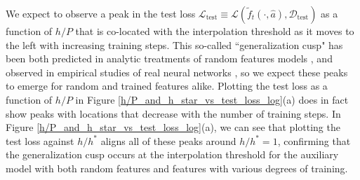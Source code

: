 \documentclass[11pt]{article}
\begin{document}
We expect to observe a peak in the test loss $\mathcal L_\text{test} \equiv \mathcal L (\tilde f_t(\cdot, \hat 
a), \mathcal D_\text{test})$ as a function of $h/P$ that is co-located with the interpolation threshold as it moves to the left with increasing training steps. This so-called ``generalization cusp" has been both predicted in analytic treatments of random features models \cite{meiGeneralizationErrorRandom2019}, \cite{dengModelDoubleDescent2020} and observed in empirical studies of real neural networks \cite{geigerJammingTransitionParadigm2019,spiglerJammingTransitionOverparametrization2019}, so we expect these peaks to emerge for random and trained features alike. Plotting the test loss as a function of $h/P$ in Figure \ref{h/P_and_h_star_vs_test_loss_log}(a) does in fact show peaks with locations that decrease with the number of training steps. In Figure \ref{h/P_and_h_star_vs_test_loss_log}(a), we can see that plotting the test loss against $h/h^*$ aligns all of these peaks around $h/h^*=1$, confirming that the generalization cusp occurs at the interpolation threshold for the auxiliary model with both random features and features with various degrees of training.
\end{document}
